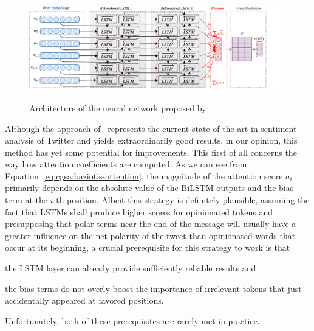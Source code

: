 \begin{figure}[htbp!]
{
  \centering
  \includegraphics[width=\linewidth]{img/baziotis.png}
}
\caption[Neural network of \citet{Baziotis:17}]{Architecture of the
  neural network proposed
  by~\citet{Baziotis:17}}\label{cgsa:fig:baziotis}
\end{figure}

Although the approach of~\citet{Baziotis:17} represents the current
state of the art in sentiment analysis of Twitter and yields
extraordinarily good results, in our opinion, this method has yet some
potential for improvements.  This first of all concerns the way how
attention coefficients are computed.  As we can see from
Equation~\ref{eq:cgsa:baziotis-attention}, the magnitude of the
attention score $a_i$ primarily depends on the absolute value of the
BiLSTM outputs and the bias term at the $i$-th position.  Albeit this
strategy is definitely plausible, assuming the fact that LSTMs shall
produce higher scores for opinionated tokens and presupposing that
polar terms near the end of the message will usually have a greater
influence on the net polarity of the tweet than opinionated words that
occur at its beginning, a crucial prerequisite for this strategy to
work is that
\begin{inparaenum}[(i)]
\item the LSTM layer can already provide sufficiently reliable results
  and
\item the bias terms do not overly boost the importance of irrelevant
  tokens that just accidentally appeared at favored positions.
\end{inparaenum}
Unfortunately, both of these prerequisites are rarely met in practice.

